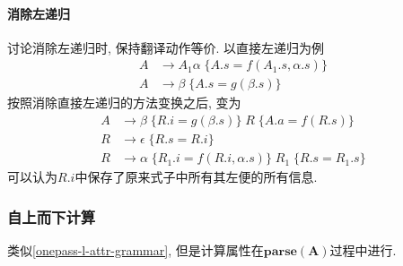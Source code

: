 \documentclass{ctexart}
\begin{document}
\paragraph{消除左递归} 讨论消除左递归时, 保持翻译动作等价. 以直接左递归为例\begin{align*}
        A & \to A_1 \alpha \; \{ A.s = f(A_1.s, \alpha.s)\}\\
        A & \to \beta  \;     \{ A.s = g(\beta.s)\}
    \end{align*}
    按照消除直接左递归的方法变换之后, 变为 \begin{align*}
        A & \to \beta \;     \{ R.i = g(\beta.s) \} \; R \;             \{A.a = f(R.s)\}\\
        R & \to \epsilon  \; \{ R.s = R.i\}\\
        R & \to \alpha \;    \{ R_1.i = f(R.i, \alpha.s) \}\; R_1  \;   \{ R.s = R_1.s \}
    \end{align*}
    可以认为$R.i$中保存了原来式子中所有其左便的所有信息.
\subsubsection{自上而下计算}
    类似\ref{onepass-l-attr-grammar}, 但是计算属性在$\mathbf{parse(A)}$过程中进行.
\end{document}
